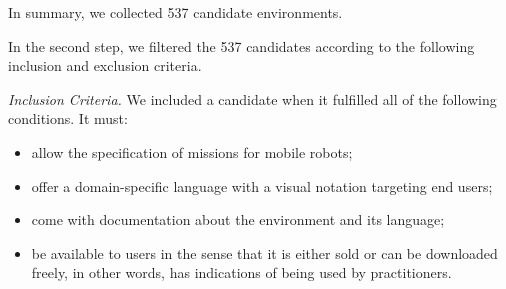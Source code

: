 
In summary, we collected 537 candidate environments.

In the second step, we filtered the 537 candidates according to the following inclusion and exclusion criteria.

\noindent
 \emph{Inclusion Criteria.} We included a candidate when it fulfilled all of the following conditions. It must:
\begin{itemize}
\item allow the specification of missions for mobile robots; 
\item offer a domain-specific language with a visual notation targeting end users; %
\item come with documentation about the environment and its language;
\item be available to users in the sense that it is either sold or can be downloaded freely, in other words, has indications of being used by practitioners.
\end{itemize}


